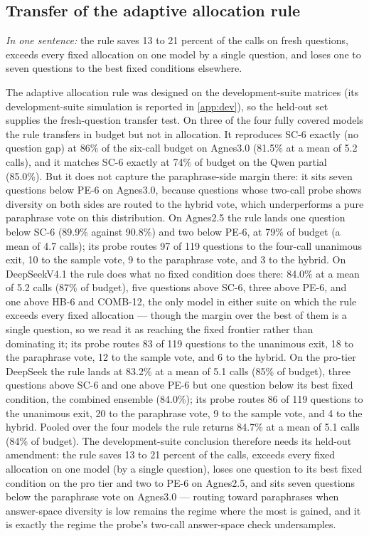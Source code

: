 \subsection{Transfer of the adaptive allocation rule}
\label{sec:heldoutrule}

\emph{In one sentence:} the rule saves 13 to 21 percent of the calls on fresh questions, exceeds every fixed allocation on one model by a single question, and loses one to seven questions to the best fixed conditions elsewhere.

The adaptive allocation rule was designed on the development-suite matrices (its development-suite simulation is reported in \ref{app:dev}), so the held-out set supplies the fresh-question transfer test. On three of the four fully covered models the rule transfers in budget but not in allocation. It reproduces SC-6 exactly (no question gap) at 86\% of the six-call budget on Agnes3.0 (81.5\% at a mean of 5.2 calls), and it matches SC-6 exactly at 74\% of budget on the Qwen partial (85.0\%). But it does not capture the paraphrase-side margin there: it sits seven questions below PE-6 on Agnes3.0, because questions whose two-call probe shows diversity on both sides are routed to the hybrid vote, which underperforms a pure paraphrase vote on this distribution. On Agnes2.5 the rule lands one question below SC-6 (89.9\% against 90.8\%) and two below PE-6, at 79\% of budget (a mean of 4.7 calls); its probe routes 97 of 119 questions to the four-call unanimous exit, 10 to the sample vote, 9 to the paraphrase vote, and 3 to the hybrid. On DeepSeekV4.1 the rule does what no fixed condition does there: 84.0\% at a mean of 5.2 calls (87\% of budget), five questions above SC-6, three above PE-6, and one above HB-6 and COMB-12, the only model in either suite on which the rule exceeds every fixed allocation --- though the margin over the best of them is a single question, so we read it as reaching the fixed frontier rather than dominating it; its probe routes 83 of 119 questions to the unanimous exit, 18 to the paraphrase vote, 12 to the sample vote, and 6 to the hybrid. On the pro-tier DeepSeek the rule lands at 83.2\% at a mean of 5.1 calls (85\% of budget), three questions above SC-6 and one above PE-6 but one question below its best fixed condition, the combined ensemble (84.0\%); its probe routes 86 of 119 questions to the unanimous exit, 20 to the paraphrase vote, 9 to the sample vote, and 4 to the hybrid. Pooled over the four models the rule returns 84.7\% at a mean of 5.1 calls (84\% of budget). The development-suite conclusion therefore needs its held-out amendment: the rule saves 13 to 21 percent of the calls, exceeds every fixed allocation on one model (by a single question), loses one question to its best fixed condition on the pro tier and two to PE-6 on Agnes2.5, and sits seven questions below the paraphrase vote on Agnes3.0 --- routing toward paraphrases when answer-space diversity is low remains the regime where the most is gained, and it is exactly the regime the probe's two-call answer-space check undersamples.


